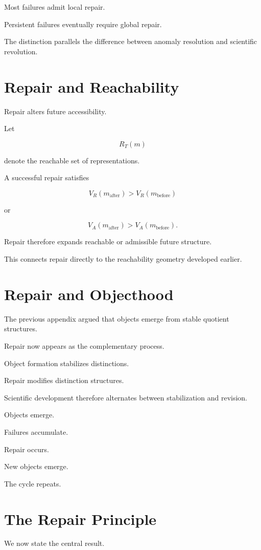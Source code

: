 \documentclass[11pt,oneside,openany]{book}
\begin{document}
Most failures admit local repair.

Persistent failures eventually require global repair.

The distinction parallels the difference between anomaly resolution and scientific revolution.

\section{Repair and Reachability}

Repair alters future accessibility.

Let

\[
R_T(m)
\]

denote the reachable set of representations.

A successful repair satisfies

\[
V_R(m_{\text{after}})
>
V_R(m_{\text{before}})
\]

or

\[
V_A(m_{\text{after}})
>
V_A(m_{\text{before}}).
\]

Repair therefore expands reachable or admissible future structure.

This connects repair directly to the reachability geometry developed earlier.

\section{Repair and Objecthood}

The previous appendix argued that objects emerge from stable quotient structures.

Repair now appears as the complementary process.

Object formation stabilizes distinctions.

Repair modifies distinction structures.

Scientific development therefore alternates between stabilization and revision.

Objects emerge.

Failures accumulate.

Repair occurs.

New objects emerge.

The cycle repeats.

\section{The Repair Principle}

We now state the central result.
\end{document}

